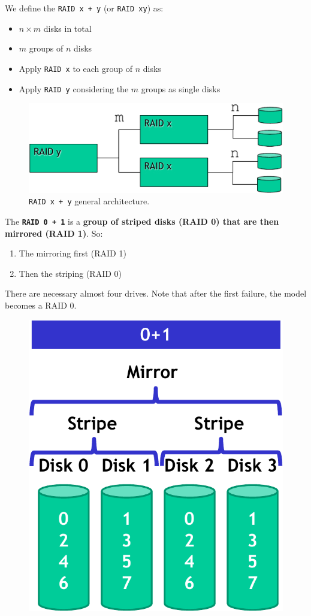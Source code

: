 \highspace
We define the \texttt{RAID x + y} (or \texttt{RAID xy}) as:
\begin{itemize}
    \item $n \times m$ disks in total
    \item $m$ groups of $n$ disks
    \item Apply \texttt{RAID x} to each group of $n$ disks
    \item Apply \texttt{RAID y} considering the $m$ groups as single disks
\end{itemize}
\newpage
\begin{figure}[!htp]
    \centering
    \includegraphics[width=.6\textwidth]{img/raid-2.pdf}
    \caption{\texttt{RAID x + y} general architecture.}
\end{figure}

\label{RAID 0 + 1}\noindent
The \hypertarget{RAID 0 + 1}{\texttt{\textbf{RAID 0 + 1}}} is a \textbf{group of striped disks (RAID 0) that are then mirrored (RAID 1)}. So:
\begin{enumerate}
    \item The mirroring first (RAID 1)
    \item Then the striping (RAID 0)
\end{enumerate}
There are necessary almost four drives. Note that after the first failure, the model becomes a RAID 0.
\begin{figure}[!htp]
    \centering
    \includegraphics[width=.5\textwidth]{img/raid-3.pdf}
\end{figure}

